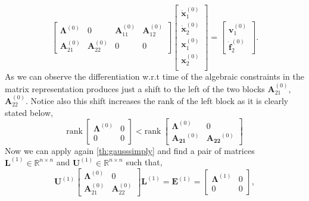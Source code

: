 		\begin{equation}
			\label{eq:DAEafterfirstdiff}
			\begin{bmatrix}
				\bm{\Lambda}^{(0)}	& 0 				& \bm{A}_{11}^{(0)} 	& \bm{A}_{12}^{(0)} \\
				\bm{A}_{21}^{(0)}	& \bm{A}_{22}^{(0)}	& 0 					& 0    
			\end{bmatrix}
			\begin{bmatrix}
				\dot{\bm{x}}_{1}^{(0)}\\
				\dot{\bm{x}}_{2}^{(0)} \\
				\bm{x}_{1}^{(0)}\\
				\bm{x}_{2}^{(0)}\\
			\end{bmatrix}
			= 
			\begin{bmatrix}
				\bm{v}_{1}^{(0)}\\
				\dot{\bm{f}}_{2}^{(0)}
			\end{bmatrix}.
		\end{equation}
		As we can observe the differentiation w.r.t time of the 
		algebraic constraints in the matrix representation produces
		just a shift to the left of the two blocks $\bm{A}_{21}^{(0)}$,
		$\bm{A}_{22}^{(0)}$.
		Notice also this shift increases the rank of the
		left block as it is clearly stated below,
		\begin{equation}
				\textrm{rank}~
				\begin{bmatrix}
					\bm{\Lambda}^{(0)} 	& 0 \\
					0 					& 0 
				\end{bmatrix} <
				\textrm{rank}~
				\begin{bmatrix}
					\bm{\Lambda}^{(0)}	& 0 \\
					\bm{A_{21}}^{(0)}	& \bm{A_{22}}^{(0)}
				\end{bmatrix}
		\end{equation}
		Now we can apply again \cref{th:gausssimply} and find a pair
		of matrices $\bm{L}^{(1)}\in\mathbb{R}^{n\times n}$ and
		$\bm{U}^{(1)}\in\mathbb{R}^{n\times n}$ such that,
		\begin{equation*}
			\bm{U}^{(1)}
			\begin{bmatrix}
				\bm{\Lambda}^{(0)}	& 0 \\
				\bm{A}_{21}^{(0)}	& \bm{A}_{22}^{(0)}
			\end{bmatrix}
			\bm{L}^{(1)} 
			= \bm{E}^{(1)} = 
			\begin{bmatrix}
				\bm{\Lambda}^{(1)} 	& 0 \\
				0 					& 0 
			\end{bmatrix},
		\end{equation*}
